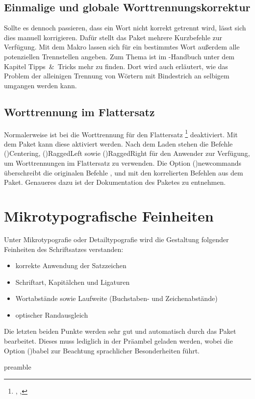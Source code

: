 \documentclass[%
  english,ngerman,%
  cdgeometry=no,DIV=12,%
  cd=false,cdfont=false,cdtitle=true,%
  headings=normal,%
  automark,%
  listof=toc,%
]{tudscrartcl}
\begin{document}
\subsection{Einmalige und globale Worttrennungskorrektur}

Sollte es dennoch passieren, dass ein Wort nicht korrekt getrennt wird, lässt
sich dies manuell korrigieren. Dafür stellt das Paket  mehrere 
Kurzbefehle zur Verfügung. Mit dem Makro  lassen sich für 
ein bestimmtes Wort außerdem alle potenziellen Trennstellen angeben. Zum Thema 
ist im \TUDScript-Handbuch unter dem Kapitel Tipps~\&~Tricks mehr zu finden. 
Dort wird auch erläutert, wie das Problem der alleinigen Trennung von Wörtern 
mit Bindestrich an selbigem umgangen werden kann.



\subsection{Worttrennung im Flattersatz}

Normalerweise ist bei  die Worttrennung für den Flattersatz%
\footnote{, , } 
deaktiviert. Mit dem Paket  kann diese aktiviert werden. Nach 
dem Laden stehen die Befehle \Macro(){Centering}, 
\Macro(){RaggedLeft} sowie 
\Macro(){RaggedRight} für den Anwender zur Verfügung, um 
Worttrennungen im Flattersatz zu verwenden. Die Option 
\Option(){newcommands} überschreibt die originalen Befehle 
,  und  mit den 
korrelierten Befehlen aus dem Paket. Genaueres dazu ist der Dokumentation des 
Paketes zu entnehmen.



\section{Mikrotypografische Feinheiten}

Unter Mikrotypografie oder Detailtypografie wird die Gestaltung folgender 
Feinheiten des Schriftsatzes verstanden:
\begin{itemize}[noitemsep]
\item korrekte Anwendung der Satzzeichen
\item Schriftart, Kapitälchen und Ligaturen
\item Wortabstände sowie Laufweite (Buchstaben- und Zeichenabstände)
\item optischer Randausgleich
\end{itemize}
%
Die letzten beiden Punkte werden sehr gut und automatisch durch das 
Paket  bearbeitet. Dieses muss lediglich in der Präambel 
geladen werden, wobei die Option \Option(){babel} zur 
Beachtung sprachlicher Besonderheiten führt.
%
\begin{Code}{preamble}
\usepackage[babel]{microtype}

\end{Code}
\end{document}
